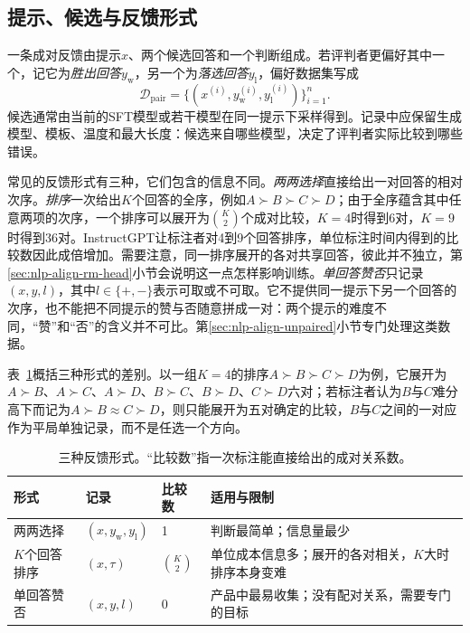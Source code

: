 \subsection{提示、候选与反馈形式}
\label{sec:nlp-align-units}

一条成对反馈由提示$x$、两个候选回答和一个判断组成。若评判者更偏好其中一个，记它为\emph{胜出回答}$y_{\mathrm w}$，另一个为\emph{落选回答}$y_{\mathrm l}$，偏好数据集写成
\[
 \mathcal D_{\mathrm{pair}}=\{(x^{(i)},y_{\mathrm w}^{(i)},y_{\mathrm l}^{(i)})\}_{i=1}^{n}.
\]
候选通常由当前的SFT模型或若干模型在同一提示下采样得到。记录中应保留生成模型、模板、温度和最大长度：候选来自哪些模型，决定了评判者实际比较到哪些错误。

常见的反馈形式有三种，它们包含的信息不同。\emph{两两选择}直接给出一对回答的相对次序。\emph{排序}一次给出$K$个回答的全序，例如$A\succ B\succ C\succ D$；由于全序蕴含其中任意两项的次序，一个排序可以展开为$\binom K2$个成对比较，$K=4$时得到6对，$K=9$时得到36对。InstructGPT让标注者对4到9个回答排序，单位标注时间内得到的比较数因此成倍增加。需要注意，同一排序展开的各对共享回答，彼此并不独立，第\ref{sec:nlp-align-rm-head}小节会说明这一点怎样影响训练。\emph{单回答赞否}只记录$(x,y,l)$，其中$l\in\{+,-\}$表示可取或不可取。它不提供同一提示下另一个回答的次序，也不能把不同提示的赞与否随意拼成一对：两个提示的难度不同，“赞”和“否”的含义并不可比。第\ref{sec:nlp-align-unpaired}小节专门处理这类数据。

表~\ref{tab:nlp-align-feedback-forms}概括三种形式的差别。以一组$K=4$的排序$A\succ B\succ C\succ D$为例，它展开为$A\succ B$、$A\succ C$、$A\succ D$、$B\succ C$、$B\succ D$、$C\succ D$六对；若标注者认为$B$与$C$难分高下而记为$A\succ B\approx C\succ D$，则只能展开为五对确定的比较，$B$与$C$之间的一对应作为平局单独记录，而不是任选一个方向。

\begin{table}[htbp]
  \centering
  \small
  \caption{三种反馈形式。“比较数”指一次标注能直接给出的成对关系数。}
  \label{tab:nlp-align-feedback-forms}
  \begin{tabularx}{\linewidth}{@{}lp{17mm}p{11mm}X@{}}
    \toprule
    形式 & 记录 & 比较数 & 适用与限制\\
    \midrule
    两两选择 & $(x,y_{\mathrm w},y_{\mathrm l})$ & 1 & 判断最简单；信息量最少\\
    $K$个回答排序 & $(x,\tau)$ & $\binom K2$ & 单位成本信息多；展开的各对相关，$K$大时排序本身变难\\
    单回答赞否 & $(x,y,l)$ & 0 & 产品中最易收集；没有配对关系，需要专门的目标\\
    \bottomrule
  \end{tabularx}
\end{table}

